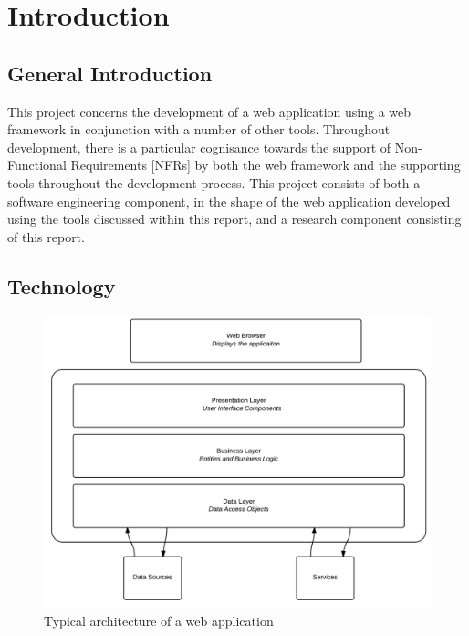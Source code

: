 \chapter{Introduction}
\label{intro}

\section{General Introduction}
This project concerns the development of a web application using a web framework in conjunction with a number of other tools. Throughout development, there is a particular cognisance towards the support of Non-Functional Requirements [NFRs] by both the web framework and the supporting tools throughout the development process. This project consists of both a software engineering component, in the shape of the web application developed using the tools discussed within this report, and a research component consisting of this report.

\section{Technology}

\begin{figure}[H]
\begin{center}
\includegraphics[scale=0.24]{webapp.PNG}
\end{center}
\caption{Typical architecture of a web application}
\end{figure}

